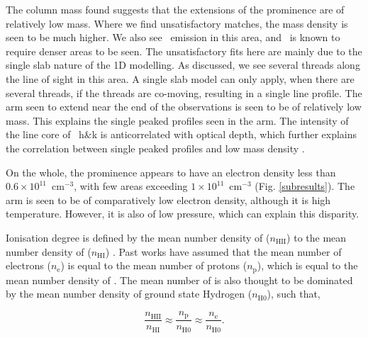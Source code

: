 The column mass found suggests that the extensions of the prominence are of relatively low mass. Where we find unsatisfactory matches, the mass density is seen to be much higher. We also see \ha\ emission in this area, and \ha\ is known to require denser areas to be seen. The unsatisfactory fits here are mainly due to the single slab nature of the 1D modelling. As discussed, we see several threads along the line of sight in this area. A single slab model can only apply, when there are several threads, if the threads are co-moving, resulting in a single line profile. The arm seen to extend near the end of the observations is seen to be of relatively low mass. This explains the single peaked profiles seen in the arm. The intensity of the line core of \mgii~h\&k is anticorrelated with optical depth, which further explains the correlation between single peaked profiles and low mass density \citep{leenaarts_formation_2013}.

On the whole, the prominence appears to have an electron density less than $0.6\times10^{11}$~cm$^{-3}$, with few areas exceeding $1\times10^{11}$~cm$^{-3}$ (Fig. \ref{subresults}). The arm is seen to be of comparatively low electron density, although it is high temperature. However, it is also of low pressure, which can explain this disparity. 

Ionisation degree is defined by the mean number density of  ($n_\text{HII}$) to the mean number density of  ($n_\text{HI}$) \citep{tandberg-hanssen_nature_1995}. Past works have assumed that the mean number of electrons ($n_\text{e}$) is equal to the mean number of protons ($n_\text{p}$), which is equal to the mean number density of . The mean number of  is also thought to be dominated by the mean number density of ground state Hydrogen ($n_\text{H0}$), such that,

\begin{equation}
    \frac{n_\text{HII}}{n_\text{HI}}\approx\frac{n_\text{p}}{n_\text{H0}}\approx\frac{n_\text{e}}{n_\text{H0}}.
\end{equation}

